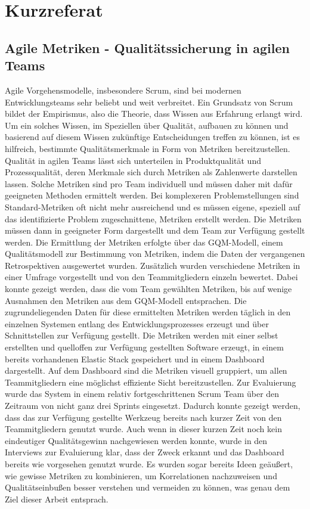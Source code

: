 \newpage
\chapter*{Kurzreferat}
\section*{Agile Metriken {-} Qualitätssicherung in agilen Teams}

Agile Vorgehensmodelle, insbesondere Scrum, sind bei modernen Entwicklungsteams sehr beliebt und weit verbreitet.
Ein Grundsatz von Scrum bildet der Empirismus, also die Theorie, dass Wissen aus Erfahrung erlangt wird.
Um ein solches Wissen, im Speziellen über Qualität, aufbauen zu können und basierend auf diesem Wissen zukünftige Entscheidungen treffen zu können, ist es hilfreich, bestimmte Qualitätsmerkmale in Form von Metriken bereitzustellen.
Qualität in agilen Teams lässt sich unterteilen in Produktqualität und Prozessqualität, deren Merkmale sich durch Metriken als Zahlenwerte darstellen lassen.
Solche Metriken sind pro Team individuell und müssen daher mit dafür geeigneten Methoden ermittelt werden.
Bei komplexeren Problemstellungen sind Standard-Metriken oft nicht mehr ausreichend und es müssen eigene, speziell auf das identifizierte Problem zugeschnittene, Metriken erstellt werden.
Die Metriken müssen dann in geeigneter Form dargestellt und dem Team zur Verfügung gestellt werden.
Die Ermittlung der Metriken erfolgte über das \ac{GQM}-Modell, einem Qualitätsmodell zur Bestimmung von Metriken, indem die Daten der vergangenen Retrospektiven ausgewertet wurden.
Zusätzlich wurden verschiedene Metriken in einer Umfrage vorgestellt und von den Teammitgliedern einzeln bewertet.
Dabei konnte gezeigt werden, dass die vom Team gewählten Metriken, bis auf wenige Ausnahmen den Metriken aus dem \ac{GQM}-Modell entsprachen.
Die zugrundeliegenden Daten für diese ermittelten Metriken werden täglich in den einzelnen Systemen entlang des Entwicklungsprozesses erzeugt und über Schnittstellen zur Verfügung gestellt.
Die Metriken werden mit einer selbst erstellten und quelloffen zur Verfügung gestellten Software erzeugt, in einem bereits vorhandenen Elastic Stack gespeichert und in einem Dashboard dargestellt.
Auf dem Dashboard sind die Metriken visuell gruppiert, um allen Teammitgliedern eine möglichst effiziente Sicht bereitzustellen.
Zur Evaluierung wurde das System in einem relativ fortgeschrittenen Scrum Team über den Zeitraum von nicht ganz drei Sprints eingesetzt.
Dadurch konnte gezeigt werden, dass das zur Verfügung gestellte Werkzeug bereits nach kurzer Zeit von den Teammitgliedern genutzt wurde.
Auch wenn in dieser kurzen Zeit noch kein eindeutiger Qualitätsgewinn nachgewiesen werden konnte, wurde in den Interviews zur Evaluierung klar, dass der Zweck erkannt und das Dashboard bereits wie vorgesehen genutzt wurde.
Es wurden sogar bereits Ideen geäußert, wie gewisse Metriken zu kombinieren, um Korrelationen nachzuweisen und Qualitätseinbußen besser verstehen und vermeiden zu können, was genau dem Ziel dieser Arbeit entsprach.

